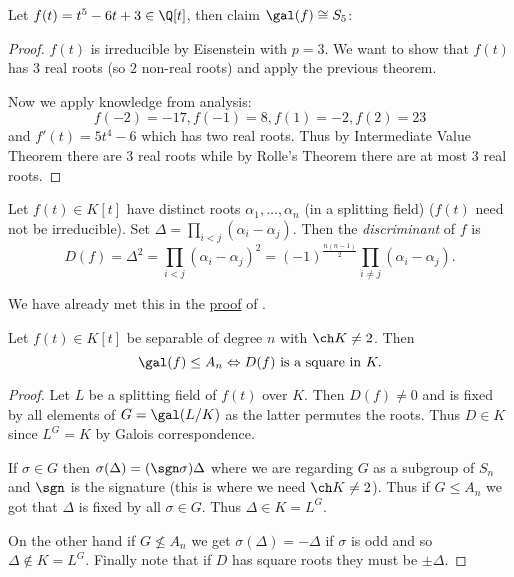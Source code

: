 \documentclass[a4paper]{article}
\begin{document}
\begin{eg}
  Let \(f(t) = t^5 - 6t + 3 \in \Q[t]\), then claim \(\gal(f) \cong S_5\):

  \begin{proof}
    \(f(t)\) is irreducible by Eisenstein with \(p = 3\). We want to show that \(f(t)\) has \(3\) real roots (so \(2\) non-real roots) and apply the previous theorem.

    Now we apply knowledge from analysis:
    \[
      f(-2) = -17, f(-1) = 8, f(1) = -2, f(2) = 23
    \]
    and \(f'(t) = 5t^4 - 6\) which has two real roots. Thus by Intermediate Value Theorem there are \(3\) real roots while by Rolle's Theorem there are at most \(3\) real roots.
  \end{proof}
\end{eg}

\begin{definition}[discriminant]
  Let \(f(t) \in K[t]\) have distinct roots \(\alpha_1, \dots, \alpha_n\) (in a splitting field) (\(f(t)\) need not be irreducible). Set \(\Delta = \prod_{i < j}(\alpha_i - \alpha_j)\). Then the \emph{discriminant} of \(f\) is
  \[
    D(f) = \Delta^2 = \prod_{i < j}(\alpha_i - \alpha_j)^2 = (-1)^{\frac{n(n-1)}{2}} \prod_{i \neq j}(\alpha_i - \alpha_j).
  \]
\end{definition}

\begin{remark}
  We have already met this in the \hyperref[proof:vandermonde]{proof} of .
\end{remark}

\begin{lemma}
  Let \(f(t) \in K[t]\) be separable of degree \(n\) with \(\ch K \neq 2\). Then
  \[
    \gal(f) \leq A_n \Leftrightarrow D(f) \text{ is a square in } K.
  \]
\end{lemma}

\begin{proof}
  Let \(L\) be a splitting field of \(f(t)\) over \(K\). Then \(D(f) \neq 0\) and is fixed by all elements of \(G = \gal(L/K)\) as the latter permutes the roots. Thus \(D \in K\) since \(L^G = K\) by Galois correspondence.

  If \(\sigma \in G\) then \(\sigma(\Delta) = (\sgn \sigma) \Delta\) where we are regarding \(G\) as a subgroup of \(S_n\) and \(\sgn\) is the signature (this is where we need \(\ch K \neq 2\)). Thus if \(G \leq A_n\) we got that \(\Delta\) is fixed by all \(\sigma \in G\). Thus \(\Delta \in K = L^G\).

  On the other hand if \(G \nleq A_n\) we get \(\sigma(\Delta) = -\Delta\) if \(\sigma\) is odd and so \(\Delta \notin K = L^G\). Finally note that if \(D\) has square roots they must be \(\pm \Delta\).
\end{proof}
\end{document}
